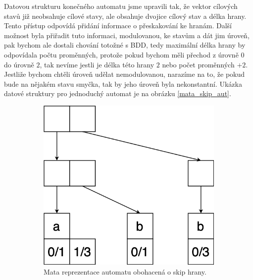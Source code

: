 Datovou strukturu konečného automatu jsme upravili tak, že vektor cílových stavů již neobsahuje cílové stavy, ale obsahuje dvojice cílový stav a délka hrany. Tento přístup odpovídá přidání informace o přeskakování ke hranám. Další možnost byla přiřadit tuto informaci, modulovanou, ke stavům a dát jim úroveň, pak bychom ale dostali chování totožné s BDD, tedy maximální délka hrany by odpovídala počtu proměnných, protože pokud bychom měli přechod z úrovně $0$ do úrovně $2$, tak nevíme jestli je délka této hrany $2$ nebo počet proměnných $+2$. Jestliže bychom chtěli úroveň udělat nemodulovanou, narazíme na to, že pokud bude na nějakém stavu smyčka, tak by jeho úroveň byla nekonstantní. Ukázka datové struktury pro jednoduchý automat je na obrázku \ref{mata_skip_aut}.

\begin{figure}[ht]
    \begin{subfigure}{.45\textwidth}
        \centering
        \includegraphics[scale=0.25]{obrazky-figures/mata_skip_aut.png}
        \caption{Mata reprezentace automatu obohacená o skip hrany.}
        \label{mata_skip_aut_tr}
    \end{subfigure}%
    \hfil
    \begin{subfigure}{.45\textwidth}
        \centering
\end{subfigure}
\end{figure}
